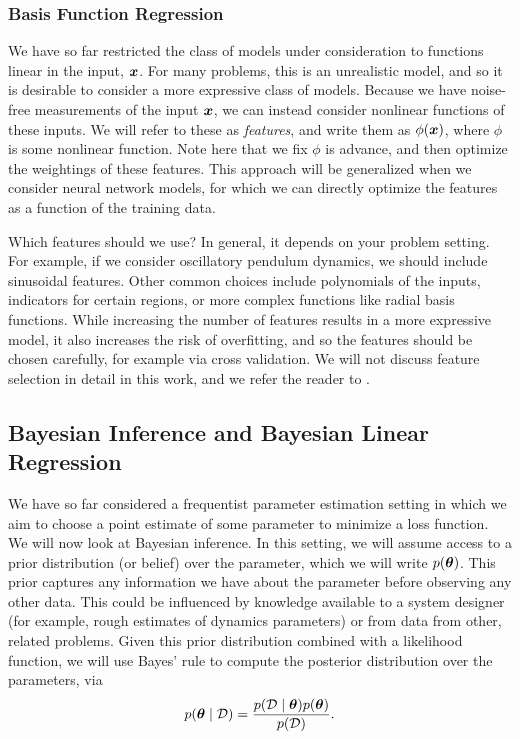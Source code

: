 
\subsubsection{Basis Function Regression}

We have so far restricted the class of models under consideration to functions linear in the input, $\bm{x}$. For many problems, this is an unrealistic model, and so it is desirable to consider a more expressive class of models. Because we have noise-free measurements of the input $\bm{x}$, we can instead consider nonlinear functions of these inputs. We will refer to these as \textit{features}, and write them as $\phi(\bm{x})$, where $\phi$ is some nonlinear function. Note here that we fix $\phi$ is advance, and then optimize the weightings of these features. This approach will be generalized when we consider neural network models, for which we can directly optimize the features as a function of the training data. 

Which features should we use? In general, it depends on your problem setting. For example, if we consider oscillatory pendulum dynamics, we should include sinusoidal features. Other common choices include polynomials of the inputs, indicators for certain regions, or more complex functions like radial basis functions. While increasing the number of features results in a more expressive model, it also increases the risk of overfitting, and so the features should be chosen carefully, for example via cross validation. We will not discuss feature selection in detail in this work, and we refer the reader to \cite{friedman2008elements}.


\subsection{Bayesian Inference and Bayesian Linear Regression}

We have so far considered a frequentist parameter estimation setting in which we aim to choose a point estimate of some parameter to minimize a loss function. We will now look at Bayesian inference. In this setting, we will assume access to a prior distribution (or belief) over the parameter, which we will write $p(\bm{\theta})$. This prior captures any information we have about the parameter before observing any other data. This could be influenced by knowledge available to a system designer (for example, rough estimates of dynamics parameters) or from data from other, related problems. Given this prior distribution combined with a likelihood function, we will use Bayes' rule to compute the posterior distribution over the parameters, via
\begin{equation}
    p(\bm{\theta} \mid \mathcal{D}) = \frac{p(\mathcal{D} \mid \bm{\theta}) p(\bm{\theta})}{p(\mathcal{D})}.
\end{equation}

